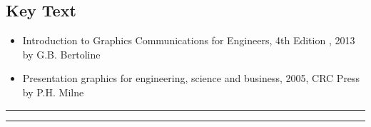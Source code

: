 \subsection*{Key Text}
\begin{itemize}
    \item Introduction to Graphics Communications for Engineers, 4th Edition , 2013 by G.B. Bertoline
    \item Presentation graphics for engineering, science and business, 2005, CRC Press by P.H. Milne
\end{itemize}
\vspace{2ex}\hrule
\vspace{2ex}\hrule\vspace{2ex}